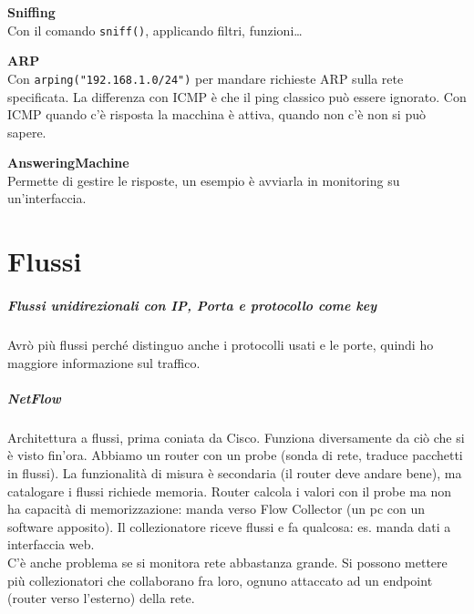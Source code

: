 \documentclass[10pt]{book}
\begin{document}
\begin{list}{}{}
	\item \textbf{Sniffing}\\
	Con il comando \texttt{sniff()}, applicando filtri, funzioni\ldots\\
	\item \textbf{ARP}\\
	Con \texttt{arping("192.168.1.0/24")} per mandare richieste ARP sulla rete specificata. La differenza con ICMP è che il ping classico può essere ignorato. Con ICMP quando c'è risposta la macchina è attiva, quando non c'è non si può sapere.
	\item \textbf{AnsweringMachine}\\
	Permette di gestire le risposte, un esempio è avviarla in monitoring su un'interfaccia. 
\end{list}
\chapter{Flussi}
\paragraph{Flussi unidirezionali con IP, Porta e protocollo come key} Avrò più flussi perché distinguo anche i protocolli usati e le porte, quindi ho maggiore informazione sul traffico.
\paragraph{NetFlow} Architettura a flussi, prima coniata da Cisco. Funziona diversamente da ciò che si è visto fin'ora. Abbiamo un router con un probe (sonda di rete, traduce pacchetti in flussi). La funzionalità di misura è secondaria (il router deve andare bene), ma catalogare i flussi richiede memoria. Router calcola i valori con il probe ma non ha capacità di memorizzazione: manda verso Flow Collector (un pc con un software apposito). Il collezionatore riceve flussi e fa qualcosa: es. manda dati a interfaccia web.\\
C'è anche problema se si monitora rete abbastanza grande. Si possono mettere più collezionatori che collaborano fra loro, ognuno attaccato ad un endpoint (router verso l'esterno) della rete.
\end{document}
